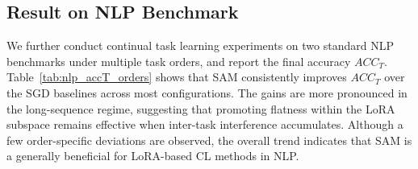 \documentclass{article}
\theoremstyle{plain}
\theoremstyle{definition}
\theoremstyle{remark}
\begin{document}
\subsection{Result on NLP Benchmark}

\begin{table}[thb]
\centering
\caption{Summary of the results on two standard CL benchmarks with T5-large model. $ACC_T$ is reported.} %
\label{tab:nlp_accT_orders} %
\setlength{\tabcolsep}{3pt}
\renewcommand{\arraystretch}{0.9}
\small
{}
\end{table}

We further conduct continual task learning experiments on two standard NLP benchmarks under multiple task orders, and report the final accuracy $ACC_T$. Table~\ref{tab:nlp_accT_orders} shows that SAM consistently improves $ACC_T$ over the SGD baselines across most configurations. The gains are more pronounced in the long-sequence regime, suggesting that promoting flatness within the LoRA subspace remains effective when inter-task interference accumulates. Although a few order-specific deviations are observed, the overall trend indicates that SAM is a generally beneficial for LoRA-based CL methods in NLP.
\end{document}
